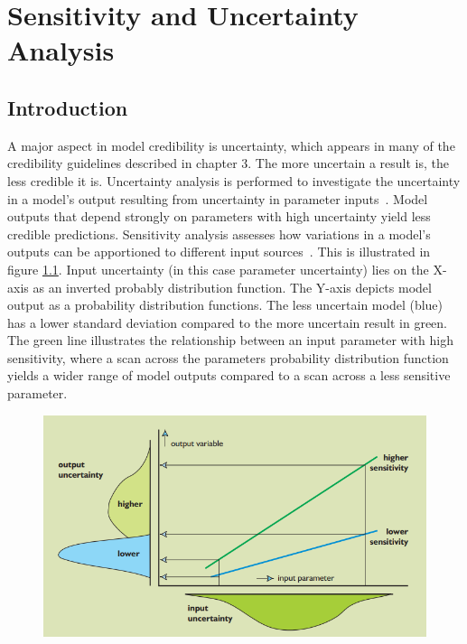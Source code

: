 \documentclass[12pt]{report}
\begin{document}
\chapter{Sensitivity and Uncertainty Analysis}

\section{Introduction}
A major aspect in model credibility is uncertainty, which appears in many of the credibility guidelines described in chapter 3. The more uncertain a result is, the less credible it is. Uncertainty analysis is performed to investigate the uncertainty in a model's output resulting from uncertainty in parameter inputs~\cite{Marino2008}. Model outputs that depend strongly on parameters with high uncertainty yield less credible predictions. Sensitivity analysis assesses how variations in a model's outputs can be apportioned to different input sources~\cite{Saltelli}. This is illustrated in figure \ref{fig:sensitivity}. Input uncertainty (in this case parameter uncertainty) lies on the X-axis as an inverted probably distribution function. The Y-axis depicts model output as a probability distribution functions. The less uncertain model (blue) has a lower standard deviation compared to the more uncertain result in green. The green line illustrates the relationship between an input parameter with high sensitivity, where a scan across the parameters probability distribution function yields a wider range of model outputs compared to a scan across a less sensitive parameter.  



\begin{figure}
    \centering
    \includegraphics[width=13cm]{images/sensitivity_uncertainty.png}
    \label{fig:sensitivity}
\end{figure}
\end{document}
